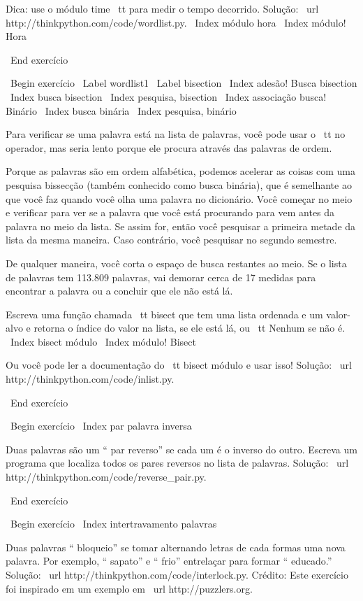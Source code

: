 \documentclass[10pt]{book}
\begin{document}
{{{{{{{Dica: use o módulo {time \ tt} para medir o tempo decorrido.
Solução: \ url {http://thinkpython.com/code/wordlist.py}.
\ Index {módulo hora}
\ Index {módulo! Hora}

\ End {} exercício


\ Begin {} exercício
\ Label {} wordlist1
\ Label {} bisection
\ Index {adesão! Busca bisection}
\ Index {busca bisection}
\ Index {pesquisa, bisection}
\ Index {associação busca! Binário}
\ Index {busca binária}
\ Index {pesquisa, binário}

Para verificar se uma palavra está na lista de palavras, você pode usar
o {\ tt no} operador, mas seria lento porque ele procura
através das palavras de ordem.

Porque as palavras são em ordem alfabética, podemos acelerar as coisas
com uma pesquisa bissecção (também conhecido como busca binária), que é
semelhante ao que você faz quando você olha uma palavra no dicionário. Você
começar no meio e verificar para ver se a palavra que você está procurando
para vem antes da palavra no meio da lista. Se assim for, então você
pesquisar a primeira metade da lista da mesma maneira. Caso contrário, você pesquisar
no segundo semestre.

De qualquer maneira, você corta o espaço de busca restantes ao meio. Se o
lista de palavras tem 113.809 palavras, vai demorar cerca de 17 medidas para
encontrar a palavra ou a concluir que ele não está lá.

Escreva uma função chamada {\ tt bisect} que tem uma lista ordenada
e um valor-alvo e retorna o índice do valor
na lista, se ele está lá, ou {\ tt Nenhum} se não é.
\ Index {bisect módulo}
\ Index {módulo! Bisect}

Ou você pode ler a documentação do {\ tt bisect} módulo
e usar isso! Solução: \ url {http://thinkpython.com/code/inlist.py}.

\ End {} exercício

\ Begin {} exercício
\ Index {par palavra inversa}

Duas palavras são um `` par reverso'' se cada um é o inverso do
outro. Escreva um programa que localiza todos os pares reversos no
lista de palavras. Solução: \ url {http://thinkpython.com/code/reverse_pair.py}.

\ End {} exercício

\ Begin {} exercício
\ Index {intertravamento palavras}

Duas palavras `` bloqueio'' se tomar alternando letras de cada formas
uma nova palavra. Por exemplo, `` sapato'' e `` frio''
entrelaçar para formar `` educado.''
Solução: \ url {http://thinkpython.com/code/interlock.py}.
Crédito: Este exercício foi inspirado em um exemplo em \ url {http://puzzlers.org}.

}}}}}}}
\end{document}

